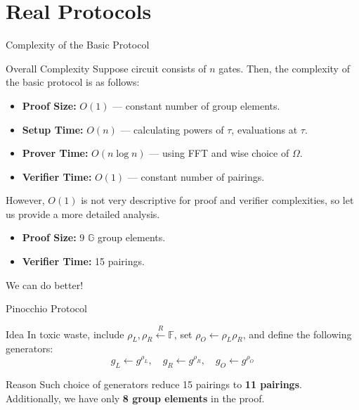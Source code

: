 \documentclass{zkdl-presentation-template}
\begin{document}
    \section{Real Protocols}
    \begin{frame}{Complexity of the Basic Protocol}
        \begin{block}{Overall Complexity}
            Suppose circuit consists of $n$ gates. Then, the complexity of the basic protocol is as follows:
            \begin{itemize}
                \item \textbf{Proof Size:} $O(1)$ --- constant number of group elements.
                \item \textbf{Setup Time:} $O(n)$ --- calculating powers of $\tau$, evaluations at $\tau$.
                \item \textbf{Prover Time:} $O(n \log n)$ --- using FFT and wise choice of $\Omega$.
                \item \textbf{Verifier Time:} $O(1)$ --- constant number of pairings.
            \end{itemize}
        
            However, $O(1)$ is not very descriptive for proof and verifier complexities, so let us provide a more detailed analysis. 
            \begin{itemize}
                \item \textbf{Proof Size:} 9 $\mathbb{G}$ group elements.
                \item \textbf{Verifier Time:} 15 pairings.
            \end{itemize}
        \end{block}

        We can do better!
    \end{frame}

    \begin{frame}{Pinocchio Protocol}
        \begin{block}{Idea}
            In toxic waste, include $\rho_L,\rho_R \xleftarrow{R} \mathbb{F}$, set $\rho_O \gets \rho_L\rho_R$, and define the following generators:
            \begin{equation*}
                g_L \gets g^{\rho_L}, \quad g_R \gets g^{\rho_R}, \quad g_O \gets g^{\rho_O}
            \end{equation*}
        \end{block}
        
        \begin{alertblock}{Reason}
            Such choice of generators reduce 15 pairings to \textbf{11 pairings}. Additionally, we have only \textbf{8 group elements} in the proof.
        \end{alertblock}
    \end{frame}
\end{document}
